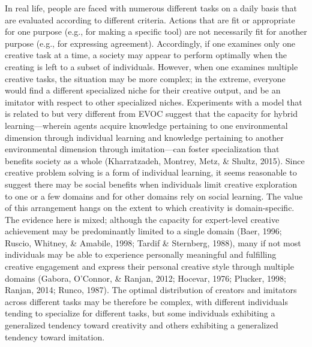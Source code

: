 \documentclass[a4paper,12pt,man,british]{apa6}
\begin{document}
In real life, people are faced with numerous different tasks on a daily basis that are evaluated according to different criteria. Actions that are fit or appropriate for one purpose (e.g., for making a specific tool) are not necessarily fit for another purpose (e.g., for expressing agreement). Accordingly, if one examines only one creative task at a time, a society may appear to perform optimally when the creating is left to a subset of individuals. However, when one examines multiple creative tasks, the situation may be more complex; in the extreme, everyone would find a different specialized niche for their creative output, and be an imitator with respect to other specialized niches. Experiments with a model that is related to but very different from EVOC suggest that the capacity for hybrid learning---wherein agents acquire knowledge pertaining to one  environmental dimension through individual learning and knowledge pertaining to another environmental dimension through imitation---can foster specialization that benefits society as a whole (Kharratzadeh, Montrey, Metz, \& Shultz, 2015). Since creative problem solving is a form of individual learning, it seems reasonable to suggest there may be social benefits when individuals limit creative exploration to one or a few domains and for other domains rely on social learning. The value of this arrangement hangs on the extent to which creativity is domain-specific. The evidence here is mixed; although the capacity for expert-level creative achievement may be predominantly limited to a single domain (Baer, 1996; Ruscio, Whitney, \& Amabile, 1998; Tardif \& Sternberg, 1988), many if not most individuals may be able to experience personally meaningful and fulfilling creative engagement and express their personal creative style through multiple domains (Gabora, O'Connor, \& Ranjan, 2012; Hocevar, 1976; Plucker, 1998; Ranjan, 2014; Runco, 1987). The optimal distribution of creators and imitators across different tasks may be therefore be complex, with different individuals tending to specialize for different tasks, but some individuals exhibiting a generalized tendency toward creativity and others exhibiting a generalized tendency toward imitation. 
\end{document}
